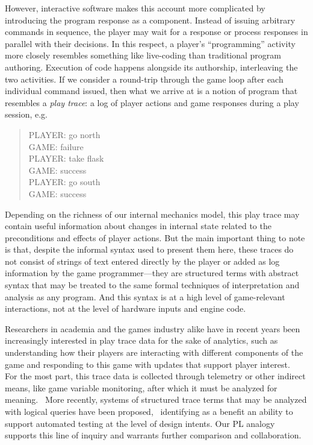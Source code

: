     However, interactive software makes this account more complicated by
    introducing the program response as a component. Instead of issuing
    arbitrary commands in sequence, the player may wait for a response or
    process responses in parallel with their decisions. In this respect, a
    player's ``programming'' activity more closely resembles something like
    live-coding than traditional program authoring. Execution of code
    happens alongside its authorship, interleaving the two activities. If
    we consider a round-trip through the game loop after each individual
    command issued, then what we arrive at is a notion of program that
    resembles a {\em play trace}: a log of player actions and game
    responses during a play session, e.g.
    \begin{quote}
      PLAYER: go north\\
      GAME: failure\\
      PLAYER: take flask\\
      GAME: success\\
      PLAYER: go south\\
      GAME: success
    \end{quote}
    Depending on the richness of our internal mechanics model, this play
    trace may contain useful information about changes in internal state
    related to the preconditions and effects of player actions. But the
    main important thing to note is that, despite the informal syntax used
    to present them here, these traces do not consist of strings of text
    entered directly by the player or added as log information by the game
    programmer---they are structured terms with abstract syntax that may be
    treated to the same formal techniques of interpretation and analysis as
    any program. And this syntax is at a high level of game-relevant
    interactions, not at the level of hardware inputs and engine code.

    Researchers in academia and the games industry alike have in recent
    years been increasingly interested in play trace data for the sake of
    analytics, such as understanding how their players are interacting with
    different components of the game and responding to this game with
    updates that support player interest.~\cite{el2013game} 
    For the most part, this trace data is collected through telemetry or
    other indirect means, like game variable monitoring, after which it
    must be analyzed for meaning.~\cite{Canossa2013} More recently,
    systems of structured trace terms that may be
    analyzed with logical queries have been
    proposed,~\cite{osborn2015playspecs} identifying as a benefit an
    ability to support automated testing at the level of design intents.
    Our PL analogy supports this line of inquiry and warrants
    further comparison and collaboration.

